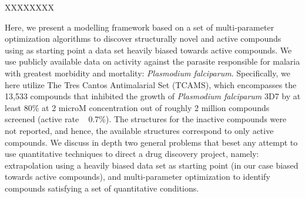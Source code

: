 \documentclass[journal=jacsat,manuscript=article]{achemso}
\begin{document}
XXXXXXXX\cite{Wallach2018}


Here, we present a modelling framework based on a set of multi-parameter optimization algorithms to discover structurally novel and active compounds 
using as starting point a data set heavily biased towards active compounds.
We use publicly available data on activity against the parasite responsible for malaria with greatest morbidity and mortality: \textit{Plasmodium falciparum}. 
Specifically, we here utilize The Tres Cantos Antimalarial Set (TCAMS), which encompasses the 13,533 compounds that inhibited the growth of \textit{Plasmodium falciparum} 3D7 by at least 80\% at 2 microM concentration out of roughly 2 million compounds screened (active rate ~ 0.7\%)\cite{Gamo2010}. The structures for the inactive compounds were not reported, and hence, the available structures correspond to only active compounds.
We discuss in depth two general problems that beset any attempt to use quantitative techniques to direct a drug discovery project, namely: extrapolation using a heavily biased data set as starting point (in our case biased towards active compounds), and multi-parameter optimization to identify compounds satisfying a set of quantitative conditions.
\newline
\newline
\end{document}
